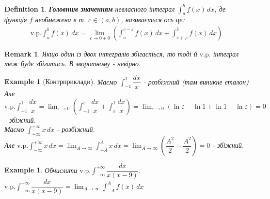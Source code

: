 \documentclass[a4paper, 10pt]{article}
\def\huge{\displaystyle}
\def\bigline{\vspace{5mm}\\}
\theoremstyle{theoremdd}
\theoremstyle{theoremdd}
\theoremstyle{theoremdd}
\newtheorem{definition}[theorem]{Definition}
\theoremstyle{theoremdd}
\theoremstyle{theoremdd}
\newtheorem{example}[theorem]{Example}
\theoremstyle{theoremdd}
\theoremstyle{theoremdd}
\newtheorem{remark}[theorem]{Remark}
\theoremstyle{theoremdd}
\theoremstyle{theoremdd}
\begin{document}
\begin{definition}
\textbf{Головним значенням} невласного інтеграл $\displaystyle\int_{a}^{b} f(x)\,dx$, де функція $f$ необмежена в т. $c \in (a,b)$, називається ось це:
\begin{align*}
\text{v.p.} \int_{a}^{b} f(x)\,dx = \lim_{\varepsilon \to 0+0} \left( \int_a^{c-\varepsilon} f(x)\,dx + \int_{c+\varphi}^b f(x)\,dx \right)
\end{align*}
\end{definition}

\begin{remark}
Якщо один із двох інтегралів збігається, то тоді й $\text{v.p}.$ інтеграл теж буде збігатись. В зворотному - невірно.
\end{remark}


\begin{example}[Контрприклади]
Маємо $\huge\int_{-1}^1 \dfrac{dx}{x}$ - розбіжний (там виникне еталон)\\
Але $\text{v.p.} \huge\int_{-1}^1 \dfrac{dx}{x} = \huge\lim_{\varepsilon \to 0} \left( \int_{-1}^\varepsilon \dfrac{dx}{x} + \int_{\varepsilon}^1 \dfrac{dx}{x} \right) = \huge\lim_{\varepsilon \to 0} (\ln \varepsilon - \ln 1 + \ln 1 - \ln \varepsilon) = 0$ - збіжний.
\bigline
Маємо $\huge\int_{-\infty}^{+\infty} x\,dx$ - розбіжний.\\
Але $\text{v.p.} \huge\int_{-\infty}^{+\infty} x\,dx = \lim_{A \to \infty} \int_{-A}^{A} x\,dx = \lim_{A \to \infty} \left( \dfrac{A^2}{2} - \dfrac{A^2}{2} \right)= 0$ - збіжний.
\end{example}

\begin{example}
Обчислити $\displaystyle \text{v.p.} \int_{-\infty}^{+\infty} \dfrac{dx}{x(x-9)}$.\\
$\displaystyle \text{v.p.} \int_{-\infty}^{+\infty} \dfrac{dx}{x(x-9)} = \lim_{A \to \infty} \int_{-A}^A f(x)\,dx$
\end{example}
\newpage

\end{document}
